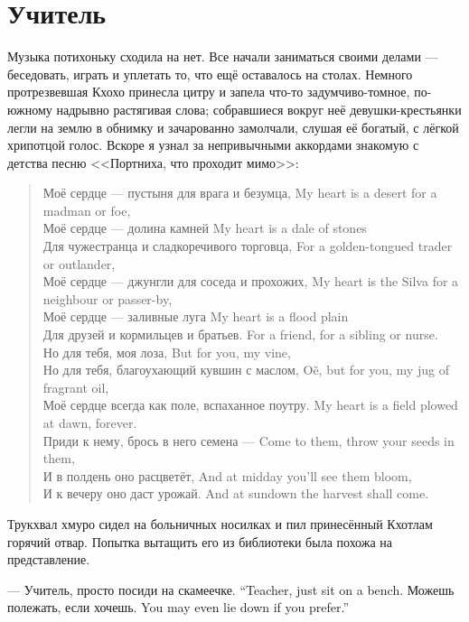 \section{Учитель}

Музыка потихоньку сходила на нет.
Все начали заниматься своими делами --- беседовать, играть и уплетать то, что ещё оставалось на столах.
Немного протрезвевшая Кхохо принесла цитру и запела что-то задумчиво-томное, по-южному надрывно растягивая слова;
собравшиеся вокруг неё девушки-крестьянки легли на землю в обнимку и зачарованно замолчали, слушая её богатый, с лёгкой хрипотцой голос.
Вскоре я узнал за непривычными аккордами знакомую с детства песню <<Портниха, что проходит мимо>>:

\begin{verse}
{Моё сердце --- пустыня для врага и безумца,}
{My heart is a desert for a madman or foe,}\\
{Моё сердце --- долина камней}
{My heart is a dale of stones}\\
{Для чужестранца и сладкоречивого торговца,}
{For a golden-tongued trader or outlander,}\\
{Моё сердце --- джунгли для соседа и прохожих,}
{My heart is the Silva for a neighbour or passer-by,}\\
{Моё сердце --- заливные луга}
{My heart is a flood plain}\\
{Для друзей и кормильцев и братьев.}
{For a friend, for a sibling or nurse.}\\
{Но для тебя, моя лоза,}
{But for you, my vine,}\\
{Но для тебя, благоухающий кувшин с маслом,}
{O\~{e}, but for you, my jug of fragrant oil,}\\
{Моё сердце всегда как поле, вспаханное поутру.}
{My heart is a field plowed at dawn, forever.}\\
{Приди к нему, брось в него семена ---}
{Come to them, throw your seeds in them,}\\
{И в полдень оно расцветёт,}
{And at midday you'll see them bloom,}\\
{И к вечеру оно даст урожай.}
{And at sundown the harvest shall come.}
\end{verse}

Трукхвал хмуро сидел на больничных носилках и пил принесённый Кхотлам горячий отвар.
Попытка вытащить его из библиотеки была похожа на представление.

{--- Учитель, просто посиди на скамеечке.}
{``Teacher, just sit on a bench.}
{Можешь полежать, если хочешь.}
{You may even lie down if you prefer.''}

